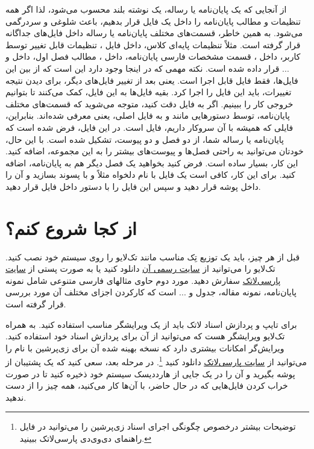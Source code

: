 از آنجایی که یک پایان‌نامه یا رساله، یک نوشته بلند محسوب می‌شود، لذا اگر همه تنظیمات و مطالب پایان‌نامه را داخل یک فایل قرار بدهیم، باعث شلوغی
و سردرگمی می‌شود. به همین خاطر، قسمت‌های مختلف پایان‌نامه یا رساله  داخل فایل‌های جداگانه قرار گرفته است. مثلاً تنظیمات پایه‌ای کلاس، داخل فایل
، 
تنظیمات قابل تغییر توسط کاربر، داخل 
،
قسمت مشخصات فارسی پایان‌نامه، داخل 
،
مطالب فصل اول، داخل 
و ... قرار داده شده است. نکته مهمی که در اینجا وجود دارد این است که از بین این  فایل‌ها، فقط فایل 
قابل اجرا است. یعنی بعد از تغییر فایل‌های دیگر، برای دیدن نتیجه تغییرات، باید این فایل را اجرا کرد. بقیه فایل‌ها به این فایل، کمک می‌کنند تا بتوانیم خروجی کار را ببینیم. اگر به فایل 
دقت کنید، متوجه می‌شوید که قسمت‌های مختلف پایان‌نامه، توسط دستورهایی مانند 
و
به فایل اصلی، یعنی 
معرفی شده‌اند. بنابراین، فایلی که همیشه با آن سروکار داریم، فایل 
است.
در این فایل، فرض شده است که پایان‌نامه یا رساله شما، از دو فصل و دو پیوست، تشکیل شده است. با این حال، خودتان می‌توانید به راحتی فصل‌ها و پیوست‌های بیشتر را به این مجموعه، اضافه کنید. این کار، بسیار ساده است. فرض کنید بخواهید یک فصل دیگر هم به پایان‌نامه، اضافه کنید. برای این کار، کافی است یک فایل با نام دلخواه مثلاً 
و با پسوند 
بسازید و آن را داخل پوشه 
قرار دهید و سپس این فایل را با دستور 
\verb!!
داخل فایل
 قرار دهید.

\section{از کجا شروع کنم؟}
قبل از هر چیز، باید یک توزیع تِک مناسب مانند تک‌لایو
را روی سیستم خود نصب کنید. تک‌لایو  را می‌توانید از 
 \href{http://www.tug.org/texlive}{سایت رسمی آن}%
 دانلود کنید یا به صورت پستی از 
 \href{http://www.parsilatex.com}{سایت پارسی‌لاتک}%
سفارش دهید. مورد دوم حاوی مثالهای فارسی متنوعی شامل نمونه پایان‌نامه، نمونه مقاله، جدول و ... است که کارکردن اجزای مختلف آن مورد بررسی قرار گرفته است.

برای تایپ و پردازش اسناد لاتک باید از یک ویرایشگر مناسب استفاده کنید. به همراه تک‌لایو ویرایشگر  هست که می‌توانید از آن برای پردازش اسناد خود استفاده کنید. 
ویرایش‌گر 
امکانات بیشتری دارد که نسخه بهینه شده آن برای زی‌پرشین با نام   را می‌توانید  از 
 \href{http://www.parsilatex.com}{سایت پارسی‌لاتک} 
 دانلود کنید
 \footnote{توضیحات بیشتر درخصوص چگونگی اجرای اسناد زی‌پرشین را می‌توانید در فایل راهنمای دی‌وی‌دی پارسی‌لاتک ببینید.}.
در مرحله بعد، سعی کنید که  یک پشتیبان از پوشه 
 بگیرید و آن را در یک جایی از هارددیسک سیستم خود ذخیره کنید تا در صورت خراب کردن فایل‌هایی که در حال حاضر، با آن‌ها کار می‌کنید، همه چیز را از 
 دست ندهید.
 
